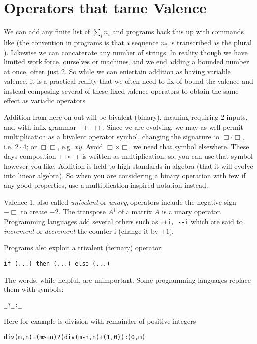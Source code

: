 

\section{Operators that tame Valence}
We can add any finite list of $\sum_{i} n_i$ and 
programs back this up with commands like  
(the convention in programs is that a sequence $n_*$ is transcribed as 
the plural ).  Likewise we can concatenate any 
number of strings.  In reality though we have limited work force, 
ourselves or machines, and we end adding a bounded number at once,
often just 2.  So while we can entertain addition as having 
variable valence, it is a practical reality that we often need to 
fix of bound the valence and instead composing several of these 
fixed valence operators to obtain the same effect as  variadic 
operators.  

Addition from here on out will be bivalent (binary), meaning 
requiring 2 inputs, and with infix grammar $\Box +\Box$.
Since we are evolving, we may as well permit multiplication as a bivalent operator
symbol, changing the signature to $\Box \cdot \Box$, i.e. $2\cdot 4$; or
$\Box\Box$, e.g. $xy$.   Avoid $\Box\times \Box$, we need that symbol elsewhere.
These days composition $\Box\circ\Box$ is written as multiplication; so, you can
use that symbol however you like.  Addition is held to high standards in algebra
(that it will evolve into linear algebra).  So when you are considering a binary
operation with few if any good properties, use a multiplication inspired
notation instead.   




Valence 1, also called \emph{univalent} or \emph{unary}, operators include the negative sign $-\Box$ to create 
$-2$.  The transpose $A^{\dagger}$ of a matrix $A$ is a unary operator.  Programming languages add several others 
such as \lstinline{++i, --i} which are said to \emph{increment} 
or \emph{decrement} the counter i (change it by $\pm 1$).

Programs also exploit a trivalent (ternary) operator:
\begin{center}
    \lstinline[language=Sava]{if (...) then (...) else (...)}
\end{center}
The words, while helpful, are unimportant.  Some programming languages 
replace them with symbols:
\begin{center}
    \lstinline[language=Sava]{_?_:_}
\end{center}
Here for example is division with remainder of positive integers
\begin{center}
\begin{lstlisting}[language=Sava,mathescape]
div(m,n)=(m>=n)?(div(m-n,n)+(1,0)):(0,m)
\end{lstlisting}
\end{center}


